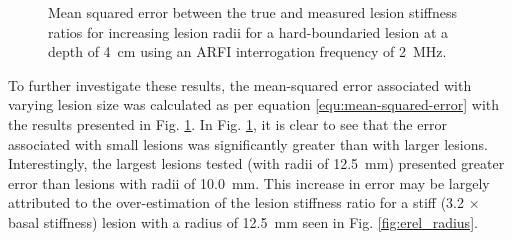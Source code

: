 			\begin{figure}[!htb]
				\centering
				\caption[Shear-wave speed quantified squared error related to lesion radius]{Mean squared error between the true and measured lesion stiffness ratios for increasing lesion radii for a hard-boundaried lesion at a depth of \SI{4}{\cm} using an ARFI interrogation frequency of \SI{2}{\MHz}.}
				\label{fig:erel_radius_mse}
			\end{figure}

			To further investigate these results, the mean-squared error associated with varying lesion size was calculated as per equation \ref{equ:mean-squared-error} with the results presented in Fig. \ref{fig:erel_radius_mse}. In Fig. \ref{fig:erel_radius_mse}, it is clear to see that the error associated with small lesions was significantly greater than with larger lesions. Interestingly, the largest lesions tested (with radii of \SI{12.5}{\mm}) presented greater error than lesions with radii of \SI{10.0}{\mm}. This increase in error may be largely attributed to the over-estimation of the lesion stiffness ratio for a stiff (3.2 $\times$ basal stiffness) lesion with a radius of \SI{12.5}{\mm} seen in Fig. \ref{fig:erel_radius}.


